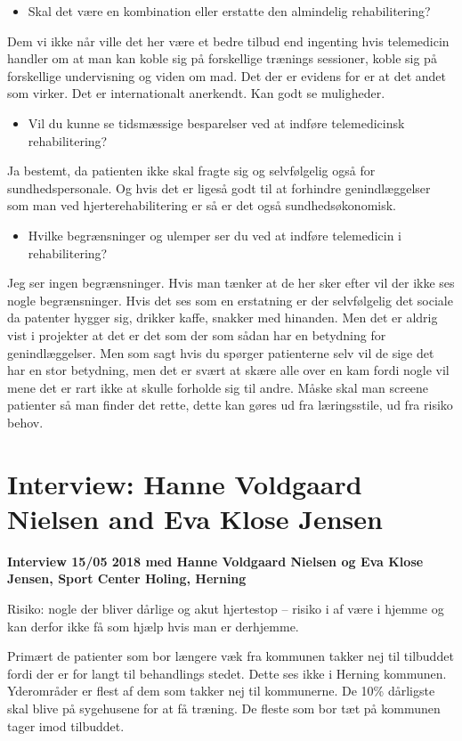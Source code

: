 \begin{itemize}
	\item Skal det være en kombination eller erstatte den almindelig rehabilitering?
\end{itemize}  
Dem vi ikke når ville det her være et bedre tilbud end ingenting hvis telemedicin handler om at man kan koble sig på forskellige trænings sessioner, koble sig på forskellige undervisning og viden om mad. Det der er evidens for er at det andet som virker. Det er internationalt anerkendt. Kan godt se muligheder. 

\begin{itemize}
	\item Vil du kunne se tidsmæssige besparelser ved at indføre telemedicinsk rehabilitering?
\end{itemize} 
Ja bestemt, da patienten ikke skal fragte sig og selvfølgelig også for sundhedspersonale. Og hvis det er ligeså godt til at forhindre genindlæggelser som man ved hjerterehabilitering er så er det også sundhedsøkonomisk. 

\begin{itemize}
	\item Hvilke begrænsninger og ulemper ser du ved at indføre telemedicin i rehabilitering? 
\end{itemize} 
Jeg ser ingen begrænsninger. Hvis man tænker at de her sker efter vil der ikke ses nogle begrænsninger. Hvis det ses som en erstatning er der selvfølgelig det sociale da patenter hygger sig, drikker kaffe, snakker med hinanden. Men det er aldrig vist i projekter at det er det som der som sådan har en betydning for genindlæggelser. Men som sagt hvis du spørger patienterne selv vil de sige det har en stor betydning, men det er svært at skære alle over en kam fordi nogle vil mene det er rart ikke at skulle forholde sig til andre. Måske skal man screene patienter så man finder det rette, dette kan gøres ud fra læringsstile, ud fra risiko behov. 

\chapter{Interview: Hanne Voldgaard Nielsen and Eva Klose Jensen} \label{hanne}
\textbf{Interview 15/05 2018 med Hanne Voldgaard Nielsen og Eva Klose Jensen, Sport Center Holing, Herning}

Risiko: nogle der bliver dårlige og akut hjertestop – risiko i af være i hjemme og kan derfor ikke få som hjælp hvis man er derhjemme. 

Primært de patienter som bor længere væk fra kommunen takker nej til tilbuddet fordi der er for langt til behandlings stedet. Dette ses ikke i Herning kommunen. Yderområder er flest af dem som takker nej til kommunerne. De 10\% dårligste skal blive på sygehusene for at få træning. De fleste som bor tæt på kommunen tager imod tilbuddet. 

